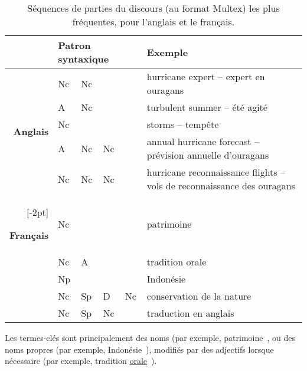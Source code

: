     \begin{table}
      \centering
      \begin{tabular}{@{~~}rl@{~~}l@{~~}l@{~~}l@{~~}p{.65\linewidth}@{~~}}
        \toprule
        & \multicolumn{4}{l}{\textbf{Patron syntaxique}} & \textbf{Exemple}\\
        \midrule
        \multirow{5}{*}[-2pt]{\begin{sideways}\textbf{Anglais}\end{sideways}} & Nc & Nc & & & hurricane expert -- expert en ouragans\\ %
        & A & Nc & & & turbulent summer -- été agité\\ %
        & Nc & & & & storms -- tempête\\ %
        & A & Nc & Nc & & annual hurricane forecast -- prévision annuelle d'ouragans\\ %
        & Nc & Nc & Nc & & hurricane reconnaissance flights -- vols de reconnaissance des ouragans\\ %
        \addlinespace[1.5\defaultaddspace]
        \multirow{5}{*}[-2pt]{\begin{sideways}\textbf{Français}\end{sideways}} & Nc & & & & patrimoine\\ %
                                                                                        & Nc & A & & & tradition orale\\ %
        & Np & & & & Indonésie\\ %
        & Nc & Sp & D & Nc & conservation de la nature\\ %
        & Nc & Sp & Nc & & traduction en anglais\\ %
        \bottomrule
      \end{tabular}
      \caption{Séquences de parties du discours (au format Multex) les plus
               fréquentes, pour l'anglais et le français.
               \label{tab:patrons_syntaxiques}}
    \end{table}

    \begin{property}
      Les termes-clés sont principalement des noms (par exemple,
      \og patrimoine~\fg, ou des noms propres (par exemple, \og Indonésie~\fg),
      modifiés par des adjectifs lorsque nécessaire (par exemple, \og tradition
      \underline{orale}~\fg).
      \label{prop:syntaxe}
    \end{property}


